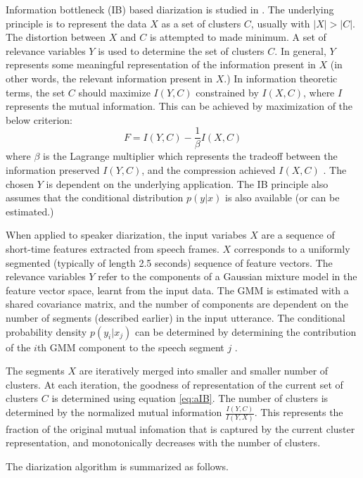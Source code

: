 \documentclass[conference]{IEEEtran}
\begin{document}
Information bottleneck (IB) based diarization is studied in
\cite{deepuThesis}. The underlying principle is to represent the data $X$ as a
set of clusters $C$, usually with $|X|>|C|$. The distortion between $X$ and $C$
is attempted to made minimum. A set of relevance variables $Y$ is used to
determine the set of clusters $C$. In general, $Y$ represents some meaningful
representation of the information present in $X$ (in other words, the relevant
information present in $X$.) In information theoretic terms, the set $C$ 
should maximize $I(Y,C)$ constrained by
$I(X,C)$, where $I$ represents the mutual information. This can be achieved by
maximization of the below criterion:
\begin{equation}
\label{eq:aIB}
F = I(Y,C) - \frac{1}{\beta}I(X,C) 
\end{equation}
where $\beta$ is the Lagrange multiplier which represents the tradeoff between
the information preserved $I(Y,C)$, and the compression achieved $I(X,C)$
\cite{deepuThesis}. The chosen $Y$ is dependent on the underlying
application. The IB principle also assumes that the conditional distribution
$p(y|x)$ is also available (or can be estimated.)

When applied to speaker diarization, the input variabes $X$ are a sequence of
short-time features extracted from speech frames. $X$ corresponds to
a uniformly segmented (typically of length 2.5 seconds) sequence of feature
vectors. The relevance variables $Y$ refer to the components of a Gaussian
mixture model in the feature vector space, learnt from the input data. The GMM 
is estimated with a shared
covariance matrix, and the number of components are dependent on the number of
segments (described earlier) in the input utterance. The conditional probability
density $p(y_i|x_j)$ can be determined by determining the contribution of the
$i$th GMM component to the speech segment $j$ \cite{deepuThesis}.

The segments $X$ are iteratively merged into smaller and smaller number of
clusters. At each iteration, the goodness of representation of the current
set of clusters $C$ is
determined using equation \ref{eq:aIB}. The number of clusters is determined by
the normalized mutual information $\frac{I(Y,C)}{I(Y,X)}$. This represents the
fraction of the original mutual infomation that is captured by the current
cluster representation, and monotonically decreases with the number of clusters.

The diarization algorithm is summarized as follows.
\end{document}
